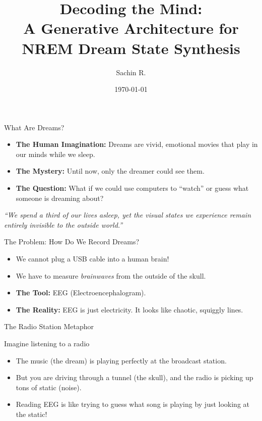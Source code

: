 \documentclass[11pt, aspectratio=169]{beamer}
\title[Generative Dream Decoding]{Decoding the Mind:\\A Generative Architecture for NREM Dream State Synthesis}
\author{Sachin R.}
\institute{Dream GAN Project}
\date{\today}
\begin{document}
\begin{frame}
\titlepage
\end{frame}

\begin{frame}{What Are Dreams?}
    \begin{itemize}
        \item \textbf{The Human Imagination:} Dreams are vivid, emotional movies that play in our minds while we sleep.
        \item \textbf{The Mystery:} Until now, only the dreamer could see them. 
        \item \textbf{The Question:} What if we could use computers to ``watch'' or guess what someone is dreaming about?
    \end{itemize}
    \vspace{0.5cm}
    \textit{``We spend a third of our lives asleep, yet the visual states we experience remain entirely invisible to the outside world.''}
\end{frame}

\begin{frame}{The Problem: How Do We Record Dreams?}
    \begin{itemize}
        \item We cannot plug a USB cable into a human brain!
        \item We have to measure \textit{brainwaves} from the outside of the skull.
        \item \textbf{The Tool:} EEG (Electroencephalogram).
        \item \textbf{The Reality:} EEG is just electricity. It looks like chaotic, squiggly lines.
    \end{itemize}
\end{frame}

\begin{frame}{The Radio Station Metaphor}
    \begin{block}{Imagine listening to a radio}
    \begin{itemize}
        \item The music (the dream) is playing perfectly at the broadcast station.
        \item But you are driving through a tunnel (the skull), and the radio is picking up tons of static (noise).
        \item Reading EEG is like trying to guess what song is playing by just looking at the static!
    \end{itemize}
    \end{block}
\end{frame}
\end{document}
